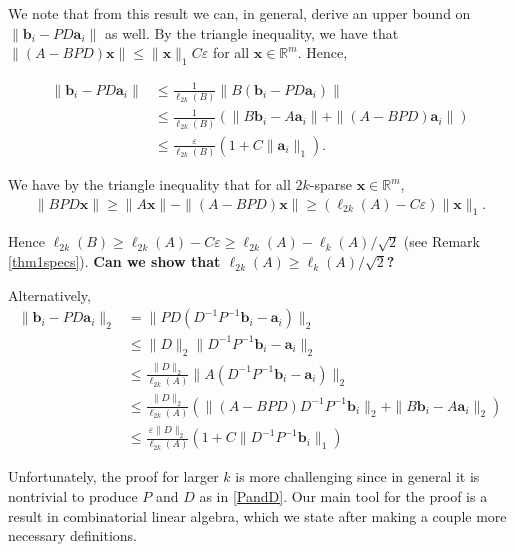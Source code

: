\documentclass[journal, onecolumn]{IEEEtran}
\begin{document}
We note that from this result we can, in general, derive an upper bound on $\|\mathbf{b}_i - PD\mathbf{a}_i\|$ as well. By the triangle inequality, we have that $\|(A-BPD)\mathbf{x}\| \leq \|\mathbf{x}\|_1C\varepsilon$ for all $\mathbf{x} \in \mathbb{R}^m$. Hence,

\begin{align*}
\|\mathbf{b}_i - PD\mathbf{a}_i\| 
&\leq \frac{1}{\ell_{2k}(B)}\|B(\mathbf{b}_i - PD\mathbf{a}_i)\| \\
&\leq \frac{1}{\ell_{2k}(B)} (\|B\mathbf{b}_i - A\mathbf{a}_i\| + \|(A - BPD)\mathbf{a}_i\|) \\
&\leq \frac{\varepsilon}{\ell_{2k}(B)}(1+C\|\mathbf{a}_i\|_1).
\end{align*}

We have by the triangle inequality that for all $2k$-sparse $\mathbf{x} \in \mathbb{R}^m$,
\begin{align}
\|BPD\mathbf{x}\| \geq \|A\mathbf{x}\| - \|(A-BPD)\mathbf{x}\| \geq (\ell_{2k}(A) - C\varepsilon)\|\mathbf{x}\|_1.
\end{align}

Hence $\ell_{2k}(B) \geq \ell_{2k}(A) - C\varepsilon \geq \ell_{2k}(A) - \ell_k(A)/\sqrt{2}$ (see Remark \ref{thm1specs}). \textbf{Can we show that $\ell_{2k}(A) \geq \ell_k(A)/\sqrt{2}$?}

Alternatively, 
\begin{align*}
\|\mathbf{b}_i - PD\mathbf{a}_i\|_2 &=  \|PD(D^{-1}P^{-1}\mathbf{b}_i - \mathbf{a}_i)\|_2 \\
&\leq \|D\|_2 \|D^{-1}P^{-1}\mathbf{b}_i - \mathbf{a}_i\|_2 \\
&\leq \frac{\|D\|_2}{\ell_{2k}(A)} \|A(D^{-1}P^{-1}\mathbf{b}_i - \mathbf{a}_i)\|_2 \\
&\leq \frac{ \|D\|_2}{\ell_{2k}(A)} \left(\|(A - BPD)D^{-1}P^{-1}\mathbf{b}_i\|_2 + \|B\mathbf{b}_i - A\mathbf{a}_i\|_2 \right) \\
&\leq \frac{\varepsilon \|D\|_2}{\ell_{2k}(A)} \left( 1 + C\|D^{-1}P^{-1}\mathbf{b}_i\|_1 \right)
\end{align*}



Unfortunately, the proof for larger $k$ is more challenging since in general it is nontrivial to produce $P$ and $D$ as in \eqref{PandD}. Our main tool for the proof is a result in combinatorial linear algebra, which we state after making a couple more necessary definitions.
\end{document}
